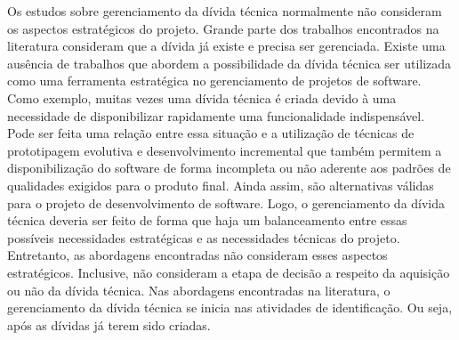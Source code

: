Os estudos sobre gerenciamento da dívida técnica normalmente não consideram os aspectos estratégicos do projeto. Grande parte dos trabalhos encontrados na literatura consideram que a dívida já existe e precisa ser gerenciada. Existe uma ausência de trabalhos que abordem a possibilidade da dívida técnica ser utilizada como uma ferramenta  estratégica no gerenciamento de projetos de software. Como exemplo, muitas vezes uma dívida técnica é criada devido à uma necessidade  de disponibilizar rapidamente uma funcionalidade indispensável.  Pode ser feita uma relação entre essa situação e a utilização de técnicas de prototipagem evolutiva e desenvolvimento incremental que também permitem a disponibilização do software de forma incompleta ou não aderente aos padrões de qualidades exigidos para o produto final. Ainda assim,   são alternativas válidas para o projeto de desenvolvimento de software.  Logo, o gerenciamento da dívida técnica deveria ser feito de forma que haja um balanceamento entre essas possíveis  necessidades estratégicas e as necessidades técnicas do projeto. Entretanto, as abordagens encontradas não consideram esses aspectos estratégicos. Inclusive, não consideram a etapa de decisão a respeito da aquisição ou não da dívida técnica. Nas abordagens encontradas na literatura\cite{seaman2011measuring,guo2011portfolio,fernandez2015analysis}, o gerenciamento da dívida técnica se inicia nas atividades de identificação. Ou seja, após as dívidas já terem sido criadas. 










